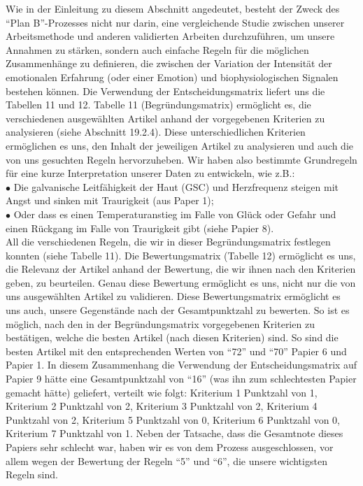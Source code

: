 Wie in der Einleitung zu diesem Abschnitt angedeutet, besteht der Zweck des ``Plan B''-Prozesses nicht nur darin, eine vergleichende Studie zwischen unserer Arbeitsmethode und anderen validierten Arbeiten durchzuführen, um unsere Annahmen zu stärken, sondern auch einfache Regeln für die möglichen Zusammenhänge zu definieren, die zwischen der Variation der Intensität der emotionalen Erfahrung (oder einer Emotion) und biophysiologischen Signalen bestehen können. 
Die Verwendung der Entscheidungsmatrix liefert uns die Tabellen 11 und 12.
Tabelle 11 (Begründungsmatrix) ermöglicht es, die verschiedenen ausgewählten Artikel anhand der vorgegebenen Kriterien zu analysieren (siehe Abschnitt 19.2.4). 
Diese unterschiedlichen Kriterien ermöglichen es uns, den Inhalt der jeweiligen Artikel zu analysieren und auch die von uns gesuchten Regeln hervorzuheben. 
Wir haben also bestimmte Grundregeln für eine kurze Interpretation unserer Daten zu entwickeln, wie z.B.:\\
$\bullet$ Die galvanische Leitfähigkeit der Haut (GSC) und Herzfrequenz steigen mit Angst und sinken mit Traurigkeit (aus Paper 1); \\
$\bullet$ Oder dass es einen Temperaturanstieg im Falle von Glück oder Gefahr und einen Rückgang im Falle von Traurigkeit gibt (siehe Papier 8). \\
All die verschiedenen Regeln, die wir in dieser Begründungsmatrix festlegen konnten (siehe Tabelle 11).
Die Bewertungsmatrix (Tabelle 12) ermöglicht es uns, die Relevanz der Artikel anhand der Bewertung, die wir ihnen nach den Kriterien geben, zu beurteilen. 
Genau diese Bewertung ermöglicht es uns, nicht nur die von uns ausgewählten Artikel zu validieren. 
Diese Bewertungsmatrix ermöglicht es uns auch, unsere Gegenstände nach der Gesamtpunktzahl zu bewerten. 
So ist es möglich, nach den in der Begründungsmatrix vorgegebenen Kriterien zu bestätigen, welche die besten Artikel (nach diesen Kriterien) sind. 
So sind die besten Artikel mit den entsprechenden Werten von ``72'' und ``70'' Papier 6 und Papier 1.
In diesem Zusammenhang die Verwendung der Entscheidungsmatrix auf Papier 9 hätte  eine Gesamtpunktzahl von ``16'' (was ihn zum schlechtesten Papier gemacht hätte) geliefert, verteilt wie folgt: 
Kriterium 1 Punktzahl von 1, Kriterium 2 Punktzahl von 2, Kriterium 3 Punktzahl von 2, Kriterium 4 Punktzahl von 2, Kriterium 5 Punktzahl von 0, Kriterium 6 Punktzahl von 0, Kriterium 7 Punktzahl von 1. 
Neben der Tatsache, dass die Gesamtnote dieses Papiers sehr schlecht war, haben wir es von dem Prozess ausgeschlossen, vor allem wegen der Bewertung der Regeln ``5'' und ``6'', die unsere wichtigsten Regeln sind.